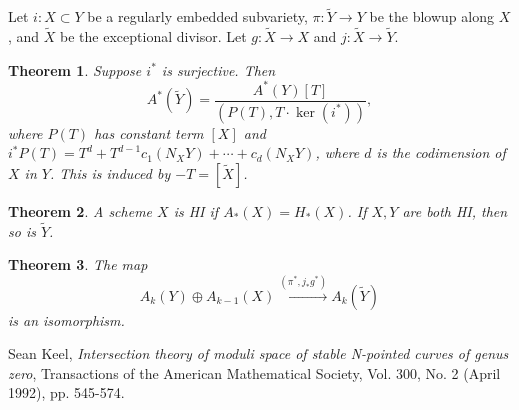 \documentclass{amsart}
\newtheorem{thm}{Theorem}[section]
\theoremstyle{definition}
\theoremstyle{remark}
\theoremstyle{plain}
\theoremstyle{definition}
\theoremstyle{remark}
\newcommand{\wt}[1]{\widetilde{#1}}
\begin{document}
Let $i \colon X \subset Y$ be a regularly embedded subvariety, $\pi \colon \wt{Y} \to Y$ be the blowup along $X$, and $\wt{X}$ be the exceptional divisor. Let $g \colon \wt{X} \to X$ and $j \colon \wt{X} \to \wt{Y}$.

\begin{thm}
    Suppose $i^*$ is surjective. Then
    \[ A^*(\wt{Y}) = \frac{A^*(Y)[T]}{(P(T), T \cdot \ker(i^*))}, \]
    where $P(T)$ has constant term $[X]$ and $i^* P(T) = T^d + T^{d-1} c_1(N_X Y) + \cdots + c_d(N_X Y)$, where $d$ is the codimension of $X$ in $Y$. This is induced by $-T = [\wt{X}]$.
\end{thm}

\begin{thm}
    A scheme $X$ is HI if $A_*(X) = H_*(X)$. If $X, Y$ are both HI, then so is $\wt{Y}$.
\end{thm}

\begin{thm}
    The map
    \[ A_k(Y) \oplus A_{k-1}(X) \xrightarrow{(\pi^*, j_* g^*)} A_k(\wt{Y}) \]
    is an isomorphism.
\end{thm}

\begin{thebibliography}{9}
     Sean Keel, \textit{Intersection theory of moduli space of stable N-pointed curves of genus zero}, Transactions of the American Mathematical Society, Vol. 300, No. 2 (April 1992), pp. 545-574. 
\end{thebibliography}
\end{document}
